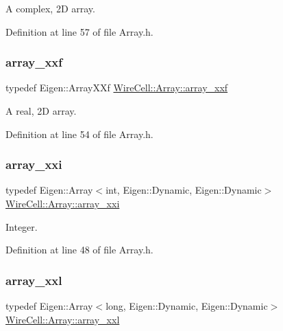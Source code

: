 A complex, 2D array. 



Definition at line 57 of file Array.\+h.

\mbox{\label{namespace_wire_cell_1_1_array_ab565fef5e33632bb02f0ed4be803020c}} 
\subsubsection{\texorpdfstring{array\+\_\+xxf}{array\_xxf}}
{\footnotesize\ttfamily typedef Eigen\+::\+Array\+X\+Xf \hyperlink{namespace_wire_cell_1_1_array_ab565fef5e33632bb02f0ed4be803020c}{Wire\+Cell\+::\+Array\+::array\+\_\+xxf}}



A real, 2D array. 



Definition at line 54 of file Array.\+h.

\mbox{\label{namespace_wire_cell_1_1_array_ab9b1f02c15124679d6a6f521e34a2479}} 
\subsubsection{\texorpdfstring{array\+\_\+xxi}{array\_xxi}}
{\footnotesize\ttfamily typedef Eigen\+::\+Array$<$int, Eigen\+::\+Dynamic, Eigen\+::\+Dynamic$>$ \hyperlink{namespace_wire_cell_1_1_array_ab9b1f02c15124679d6a6f521e34a2479}{Wire\+Cell\+::\+Array\+::array\+\_\+xxi}}



Integer. 



Definition at line 48 of file Array.\+h.

\mbox{\label{namespace_wire_cell_1_1_array_a2fa3192873f7b97d7fe22d3018a73874}} 
\subsubsection{\texorpdfstring{array\+\_\+xxl}{array\_xxl}}
{\footnotesize\ttfamily typedef Eigen\+::\+Array$<$long, Eigen\+::\+Dynamic, Eigen\+::\+Dynamic$>$ \hyperlink{namespace_wire_cell_1_1_array_a2fa3192873f7b97d7fe22d3018a73874}{Wire\+Cell\+::\+Array\+::array\+\_\+xxl}}



